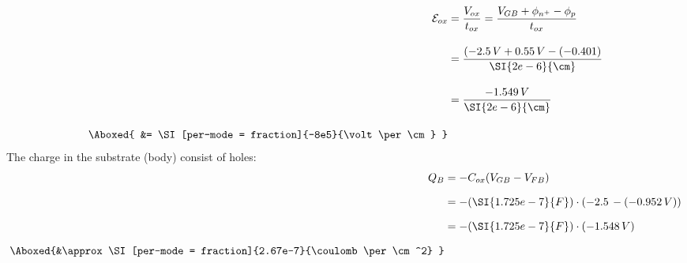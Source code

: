     \begin{align*}
        \mathcal{E}_{ox} &= \frac{V_{ox}}{t_{ox}} = \frac{V_{GB} + \phi_{n^+} - \phi_p}{t_{ox}}\\[0.35cm]
        &= \frac{(-2.5\,V + 0.55\,V -(-0.401)}{\SI{2e-6}{\cm}}\\[0.35cm]
        &= \frac{-1.549\,V}{\SI{2e-6}{\cm}}\\[0.35cm]
        \Aboxed{ &= \SI[per-mode = fraction]{-8e5}{\volt\per\cm} }
    \end{align*}
The charge in the substrate (body) consist of holes:
    \begin{align*}
        Q_B &= -C_{ox}(V_{GB} - V_{FB})\\[0.25cm]
        &= -(\SI{1.725e-7}{F})\cdot\left(-2.5\, -(-0.952\,V) \right)\\[0.25cm]
        &= -(\SI{1.725e-7}{F})\cdot(-1.548\,V)\\[0.25cm]
        \Aboxed{&\approx \SI[per-mode = fraction]{2.67e-7}{\coulomb\per\cm^2} }
    \end{align*}
